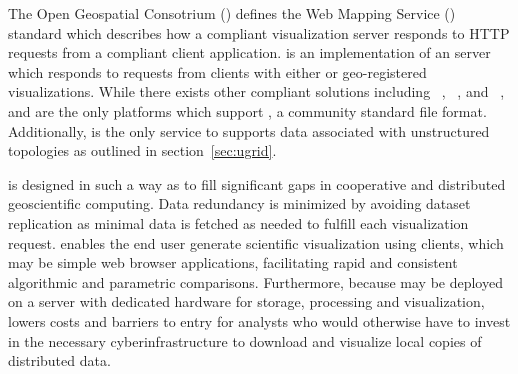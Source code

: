 The Open Geospatial Consotrium (\ogc{}) defines the Web Mapping
Service (\wms{})~\cite{wms14} standard which describes how a compliant
visualization server responds to HTTP requests from a \wms{} compliant
client application. \sciwms{} is an implementation of an \ogcwms{}
server which responds to requests from clients with either \metadata{}
or geo-registered visualizations.  While there exists other \ogcwms{}
compliant solutions including \ncwms{}~\cite{blower13},
\mapserver{}~\cite{mapserver14}, and \geoserver{}~\cite{geoserver14},
\sciwms{} and \ncwms{} are the only platforms which support \netcdf{},
a community standard file format. Additionally, \sciwms{} is the only
\ogcwms{} service to supports data associated with unstructured
topologies as outlined in section~\ref{sec:ugrid}.

\sciwms{} is designed in such a way as to fill significant gaps in
cooperative and distributed geoscientific computing. Data redundancy
is minimized by avoiding dataset replication as minimal data is
fetched as needed to fulfill each visualization request. \sciwms{}
enables the end user generate scientific visualization using \wms{}
clients, which may be simple web browser applications, facilitating
rapid and consistent algorithmic and parametric
comparisons. Furthermore, because \sciwms{} may be deployed on a
server with dedicated hardware for storage, processing and
visualization, \sciwms{} lowers costs and barriers to entry for
analysts who would otherwise have to invest in the necessary
cyberinfrastructure to download and visualize local copies of
distributed data.
